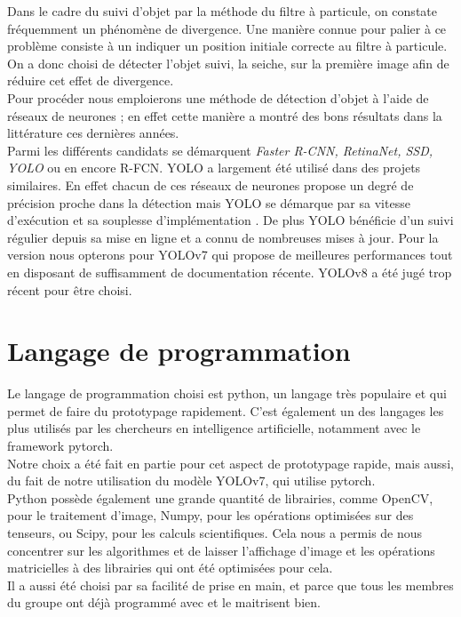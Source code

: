 Dans le cadre du suivi d'objet par la méthode du filtre à particule, on constate fréquemment un phénomène de divergence. Une manière connue pour palier à ce problème consiste à un indiquer un position initiale correcte au filtre à particule. On a donc choisi de détecter l'objet suivi, la seiche, sur la première image afin de réduire cet effet de divergence.\\
Pour procéder nous emploierons une méthode de détection d'objet à l'aide de réseaux de neurones ; en effet cette manière a montré des bons résultats dans la littérature ces dernières années.\\
Parmi les différents candidats se démarquent \emph{Faster R-CNN\cite{ren_faster_2016}, RetinaNet\cite{lin_focal_2018}, SSD\cite{liu_ssd_2016}, YOLO\cite{redmon_you_2016}} ou en encore R-FCN\cite{dai_r-fcn_2016}. 
YOLO a largement été utilisé dans des projets similaires. En effet chacun de ces réseaux de neurones propose un degré de précision proche dans la détection mais YOLO se démarque par sa vitesse d'exécution et sa souplesse d'implémentation \cite{sanchez_review_2020}. De plus YOLO bénéficie d'un suivi régulier depuis sa mise en ligne et a connu de nombreuses mises à jour. Pour la version nous opterons pour  YOLOv7\cite{wang_yolov7_nodate} qui propose de meilleures performances tout en disposant de suffisamment de documentation récente. YOLOv8 a été jugé trop récent pour être choisi.


\section{Langage de programmation}
Le langage de programmation choisi est python, un langage très populaire et qui permet de faire du prototypage rapidement. C'est également un des langages les plus utilisés par les chercheurs en intelligence artificielle, notamment avec le framework pytorch.\\
Notre choix a été fait en partie pour cet aspect de prototypage rapide, mais aussi, du fait de notre utilisation du modèle YOLOv7\cite{wang_yolov7_nodate}, qui utilise pytorch.\\
Python possède également une grande quantité de librairies, comme OpenCV, pour le traitement d'image, Numpy, pour les opérations optimisées sur des tenseurs, ou Scipy, pour les calculs scientifiques. Cela nous a permis de nous concentrer sur les algorithmes et de laisser l'affichage d'image et les opérations matricielles à des librairies qui ont été optimisées pour cela.\\
Il a aussi été choisi par sa facilité de prise en main, et parce que tous les membres du groupe ont déjà programmé avec et le maitrisent bien.


\clearpage
